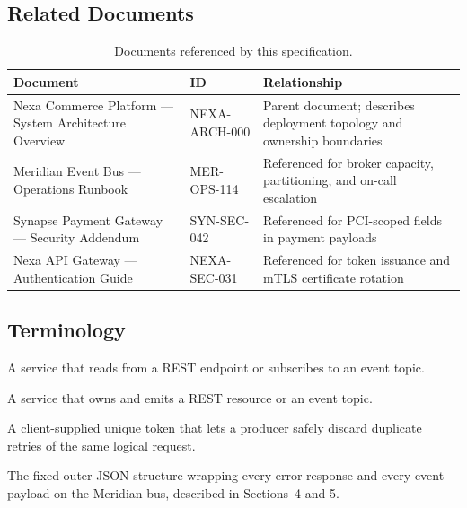 \subsection{Related Documents}
\begin{table}[h!]
\centering
\small
\begin{tabularx}{\linewidth}{@{}l l X@{}}
\toprule
\textbf{Document} & \textbf{ID} & \textbf{Relationship} \\
\midrule
Nexa Commerce Platform --- System Architecture Overview & NEXA-ARCH-000 & Parent document; describes deployment topology and ownership boundaries \\
Meridian Event Bus --- Operations Runbook & MER-OPS-114 & Referenced for broker capacity, partitioning, and on-call escalation \\
Synapse Payment Gateway --- Security Addendum & SYN-SEC-042 & Referenced for PCI-scoped fields in payment payloads \\
Nexa API Gateway --- Authentication Guide & NEXA-SEC-031 & Referenced for token issuance and mTLS certificate rotation \\
\bottomrule
\end{tabularx}
\caption{Documents referenced by this specification.}
\end{table}

\subsection{Terminology}
\begin{infobox}[title={Key Terms}]
\begin{description}[leftmargin=2.4cm,style=nextline]
  \item[Consumer] A service that reads from a REST endpoint or subscribes to an event topic.
  \item[Producer] A service that owns and emits a REST resource or an event topic.
  \item[Idempotency key] A client-supplied unique token that lets a producer safely discard
    duplicate retries of the same logical request.
  \item[Envelope] The fixed outer JSON structure wrapping every error response and every
    event payload on the Meridian bus, described in Sections~4 and 5.
\end{description}
\end{infobox}
